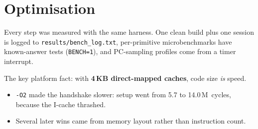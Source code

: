 \documentclass[10pt,a4paper]{article}
\newcommand{\M}{\,M}
\begin{document}
\section{Optimisation}\label{sec:opt}
Every step was measured with the same harness. One clean build plus one session is logged to
\texttt{results/bench\_log.txt}, per-primitive microbenchmarks have known-answer tests (\texttt{BENCH=1}), and
PC-sampling profiles come from a timer interrupt.

The key platform fact: with \textbf{4\,KB direct-mapped caches}, code size \emph{is} speed.
\begin{itemize}
  \item \texttt{-O2} made the handshake slower: setup went from 5.7 to 14.0\M\ cycles, because the I-cache thrashed.
  \item Several later wins came from memory layout rather than instruction count.
\end{itemize}
\end{document}
